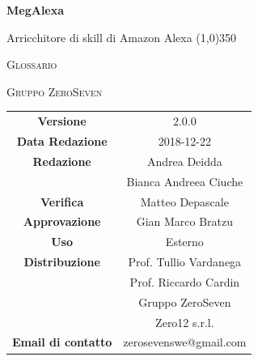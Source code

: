 \documentclass[a4paper,12pt]{article}
\author{Mirko Franco}
\date{2018-12-14}
\begin{document}
\begin{titlepage}
	\centering
	{\huge\bfseries MegAlexa\par}
	Arricchitore di skill di Amazon Alexa
	\line(1,0){350} \\
	{\scshape\LARGE Glossario \par}
	\vspace{1cm}
	{\scshape Gruppo ZeroSeven \par}
	\logo
		\begin{tabular}{c|c}
		{\hfill \textbf{Versione}} 			& 2.0.0				\\
		{\hfill\textbf{Data Redazione}} 	& 2018-12-22		\\ 
		{\hfill\textbf{Redazione}} 			& Andrea Deidda			\\ & Bianca Andreea Ciuche \\
		{\hfill\textbf{Verifica}} 				&  	Matteo Depascale				\\ 
		{\hfill\textbf{Approvazione}} 		&  		Gian Marco Bratzu			\\ 
		{\hfill\textbf{Uso}} 					& 		Esterno		\\ 
		{\hfill\textbf{Distribuzione}} 			& 			Prof. Tullio Vardanega \\ & Prof. Riccardo Cardin \\ & Gruppo ZeroSeven		\\ & Zero12 s.r.l. \\
		{\hfill\textbf{Email di contatto}} & zerosevenswe@gmail.com \\
	\end{tabular}
\end{titlepage}

	\label{LastFrontPage}
	\newpage	
	
	\glsaddall
	\pagestyle{mymain}
	\printnoidxglossaries
	\label{LastPage}
	
	
\end{document}
